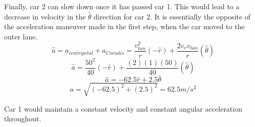 \documentclass{article}
\begin{document}
\bigskip


Finally, car 2 can slow down once it has passed car 1. This would lead to a decrease in velocity in the  $\hat{\theta}$ direction for car 2. It is essentially the opposite of the acceleration maneuver made in the first step, when the car moved to the outer lane.
\[\hat{a} = a_{centripetal} + a_{Coriolis} = \frac{v_{tan}^2}{r}(-\hat{r})+ \frac{2v_r v_{tan}} {r}(\hat{\theta}) \]
\[ \hat{a} = \frac{50^2}{40} (-\hat{r}) + \frac{(2)(1)(50)}{40}(\hat{\theta}) \]
\[ \hat{a} = -62.5 \hat{r} + 2.5 \hat{\theta} \]
\[ a = \sqrt{(-62.5)^2 + (2.5)^2} = 62.5 m/s^2 \]

Car 1 would maintain a constant velocity and constant angular acceleration throughout. 
\end{document}
